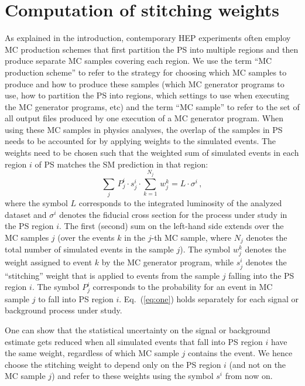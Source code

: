 \section{Computation of stitching weights}
\label{sec:stitching_weights}

As explained in the introduction,
contemporary HEP experiments often employ MC production schemes
that first partition the PS into multiple regions and then produce separate MC samples covering each region.
We use the term ``MC production scheme'' to refer to the strategy for choosing which MC samples to produce and how to produce these samples 
(which MC generator programs to use, how to partition the PS into regions, which settings to use when executing the MC generator programs, etc)
and the term ``MC sample'' to refer to the set of all output files produced by one execution of a MC generator program.
When using these MC samples in physics analyses,
the overlap of the samples in PS needs to be accounted for by applying weights to the simulated events.
The weights need to be chosen such that the weighted sum of simulated events in each region $i$ of PS 
matches the SM prediction in that region:
\begin{equation}
\sum_{j} \, P_{j}^{i} \cdot s_{j}^{i} \cdot \sum_{k=1}^{N_{j}} \, w_{j}^{k} = L \cdot \sigma^{i} \, ,
\label{eq:one}
\end{equation}
where the symbol $L$ corresponds to the integrated luminosity of the analyzed dataset
and $\sigma^{i}$ denotes the fiducial cross section for the process under study in the PS region $i$.
The first (second) sum on the left-hand side extends over the MC samples $j$ 
(over the events $k$ in the $j$-th MC sample, where $N_{j}$ denotes the total number of simulated events in the sample $j$).
The symbol $w_{j}^{k}$ denotes the weight assigned to event $k$ by the MC generator program,
while $s_{j}^{i}$ denotes the ``stitching'' weight that is applied to events from the sample $j$ falling into the PS region $i$.
The symbol $P_{j}^{i}$ corresponds to the probability for an event in MC sample $j$ to fall into PS region $i$.
Eq.~(\ref{eq:one}) holds separately for each signal or background process under study.

One can show that the statistical uncertainty on the signal or background estimate
gets reduced when all simulated events that fall into PS region $i$ have the same weight,
regardless of which MC sample $j$ contains the event.
We hence choose the stitching weight to depend only on the PS region $i$ (and not on the MC sample $j$)
and refer to these weights using the symbol $s^{i}$ from now on.


